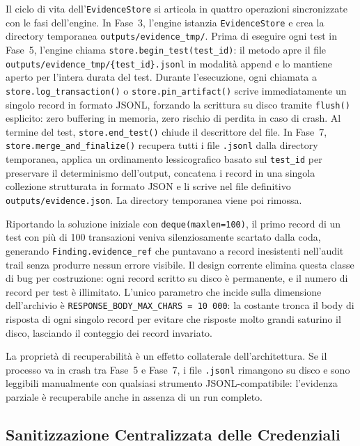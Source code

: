 Il ciclo di vita dell'\texttt{EvidenceStore} si articola in quattro operazioni sincronizzate con le fasi dell'engine. In Fase~3, l'engine istanzia \texttt{EvidenceStore} e crea la directory temporanea \texttt{outputs/evidence\_tmp/}. Prima di eseguire ogni test in Fase~5, l'engine chiama \texttt{store.begin\_test(test\_id)}: il metodo apre il file \texttt{outputs/evidence\_tmp/\{test\_id\}.jsonl} in modalità append e lo mantiene aperto per l'intera durata del test. Durante l'esecuzione, ogni chiamata a \texttt{store.log\_transaction()} o \texttt{store.pin\_artifact()} scrive immediatamente un singolo record in formato \gls{JSONL}, forzando la scrittura su disco tramite \texttt{flush()} esplicito: zero buffering in memoria, zero rischio di perdita in caso di crash. Al termine del test, \texttt{store.end\_test()} chiude il descrittore del file. In Fase~7, \texttt{store.merge\_and\_finalize()} recupera tutti i file \texttt{.jsonl} dalla directory temporanea, applica un ordinamento lessicografico basato sul \texttt{test\_id} per preservare il determinismo dell'output, concatena i record in una singola collezione strutturata in formato \gls{JSON} e li scrive nel file definitivo \texttt{outputs/evidence.json}. La directory temporanea viene poi rimossa.

Riportando la soluzione iniziale con \texttt{deque(maxlen=100)}, il primo record di un test con più di 100 transazioni veniva silenziosamente scartato dalla coda, generando \texttt{Finding.evidence\_ref} che puntavano a record inesistenti nell'audit trail senza produrre nessun errore visibile. Il design corrente elimina questa classe di bug per costruzione: ogni record scritto su disco è permanente, e il numero di record per test è illimitato. L'unico parametro che incide sulla dimensione dell'archivio è \texttt{RESPONSE\_BODY\_MAX\_CHARS~=~10\,000}: la costante tronca il body di risposta di ogni singolo record per evitare che risposte molto grandi saturino il disco, lasciando il conteggio dei record invariato.

La proprietà di recuperabilità è un effetto collaterale dell'architettura. Se il processo va in crash tra Fase~5 e Fase~7, i file \texttt{.jsonl} rimangono su disco e sono leggibili manualmente con qualsiasi strumento \gls{JSONL}-compatibile: l'evidenza parziale è recuperabile anche in assenza di un run completo.


\subsection{Sanitizzazione Centralizzata delle Credenziali}\label{subsec:sanitization}

